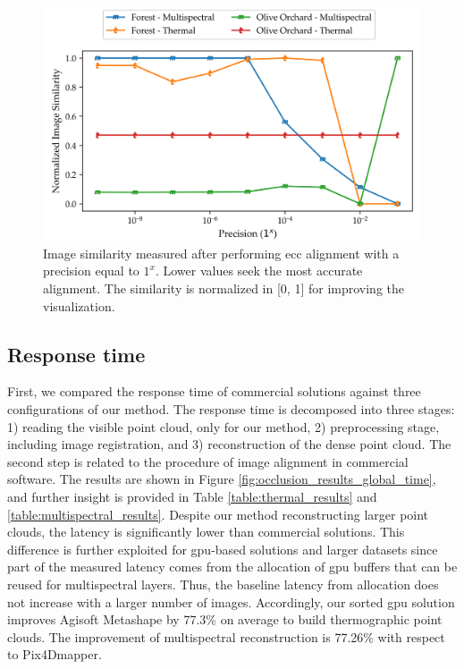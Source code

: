 \begin{figure}[ht]
    \centering
    \includegraphics[width=.9\linewidth]{figs/multi_thermal_projection/results/ecc_precision.png}
    \caption{Image similarity measured after performing \acrshort{ecc} alignment with a precision equal to $1^x$. Lower values seek the most accurate alignment. The similarity is normalized in [0, 1] for improving the visualization. }
    \label{fig:ecc_precision}
\end{figure}

\subsection{Response time}

First, we compared the response time of commercial solutions against three configurations of our method. The response time is decomposed into three stages: 1) reading the visible point cloud, only for our method, 2) preprocessing stage, including image registration, and 3) reconstruction of the dense point cloud. The second step is related to the procedure of image alignment in commercial software. The results are shown in Figure \ref{fig:occlusion_results_global_time}, and further insight is provided in Table \ref{table:thermal_results} and \ref{table:multispectral_results}. Despite our method reconstructing larger point clouds, the latency is significantly lower than commercial solutions. This difference is further exploited for \acrshort{gpu}-based solutions and larger datasets since part of the measured latency comes from the allocation of \acrshort{gpu} buffers that can be reused for multispectral layers. Thus, the baseline latency from allocation does not increase with a larger number of images. Accordingly, our sorted \acrshort{gpu} solution improves Agisoft Metashape by 77.3\% on average to build thermographic point clouds. The improvement of multispectral reconstruction is 77.26\% with respect to Pix4Dmapper. 

